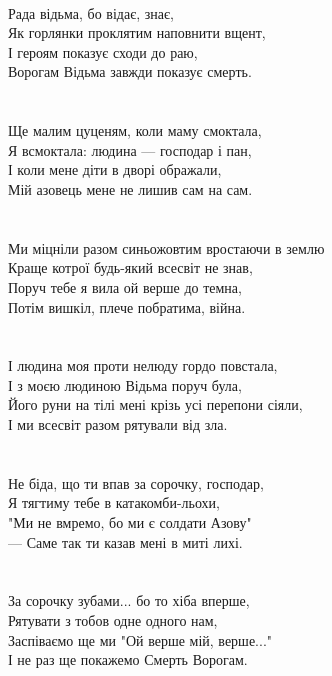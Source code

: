 \\
Рада відьма, бо відає, знає,\\
Як горлянки проклятим наповнити вщент,\\
І героям показує сходи до раю,\\
Ворогам Відьма завжди показує смерть.\\
\\
\\
Ще малим цуценям, коли маму смоктала,\\
Я всмоктала: людина — господар і пан,\\
І коли мене діти в дворі ображали,\\
Мій азовець мене не лишив сам на сам.\\
\\
\\
Ми міцніли разом синьожовтим вростаючи в землю\\
Краще котрої будь-який всесвіт не знав,\\
Поруч тебе я вила ой верше до темна,\\
Потім вишкіл, плече побратима, війна.\\
\\
\\
І людина моя проти нелюду гордо повстала,\\
І з моєю людиною Відьма поруч була,\\
Його руни на тілі мені крізь усі перепони сіяли,\\
І ми всесвіт разом рятували від зла.\\
\\
\\
Не біда, що ти впав за сорочку, господар,\\
Я тягтиму тебе в катакомби-льохи,\\
"Ми не вмремо, бо ми є солдати Азову"\\
— Саме так ти казав мені в миті лихі.\\
\\
\\
За сорочку зубами... бо то хіба вперше,\\
Рятувати з тобов одне одного нам,\\
Заспіваємо ще ми "Ой верше мій, верше..."\\
І не раз ще покажемо Смерть Ворогам.\\

\normalsize
